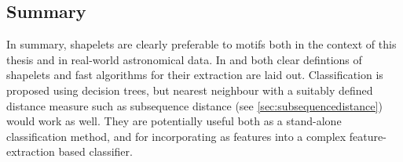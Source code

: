 	\subsection{Summary}
	In summary, shapelets are clearly preferable to motifs both in the context of this thesis and in real-world astronomical data. In \citet{ye2009time} and \citet{mueen2011logical} both clear defintions of shapelets and fast algorithms for their extraction are laid out. Classification is proposed using decision trees, but nearest neighbour with a suitably defined distance measure such as subsequence distance (see \ref{sec:subsequencedistance}) would work as well. They are potentially useful both as a stand-alone classification method, and for incorporating as features into a complex feature-extraction based classifier.
		
		\pagebreak %
		
		
		 
